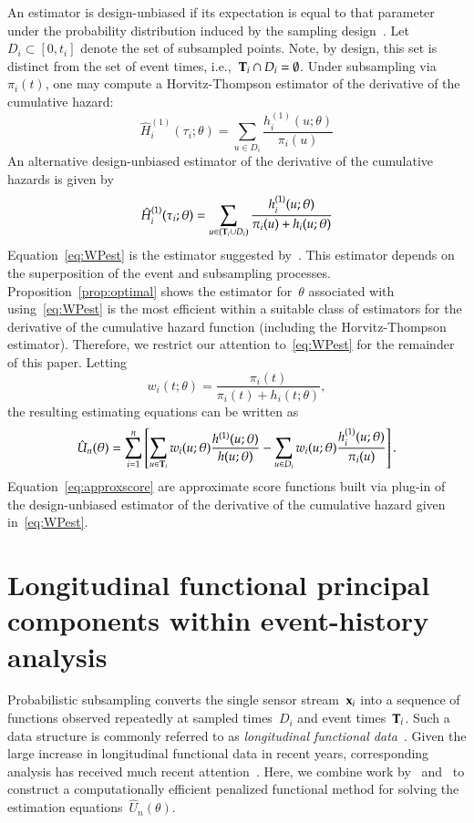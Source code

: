 \documentclass[12pt]{amsart}
\def\bfx{{\bf x}}
\def\bfT{{\bf T}}
\begin{document}
An estimator is design-unbiased if its expectation is equal to that
parameter under the probability distribution induced by the sampling
design~\citep{Cassel1977}. Let~$D_i \subset [0,t_i]$ denote the set of
subsampled points.  Note, by design, this set is distinct from the set
of event times, i.e.,~$\bfT_i \cap D_i = \emptyset$.  Under
subsampling via $\pi_i (t)$, one may compute a Horvitz-Thompson
estimator of the derivative of the cumulative hazard:
\[
\hat H_{i}^{(1)} (\tau_i; \theta) = \sum_{u \in D_i} \frac{
  h^{(1)}_i (u; \theta) }{ \pi_i (u) }
\]
An alternative design-unbiased estimator of the derivative of the
cumulative hazards is given by
\begin{equation}
\label{eq:WPest}
\hat H_{i}^{(1)} (\tau_i; \theta) = \sum_{u \in (\bfT_i \cup D_i)}
\frac{ h^{(1)}_i ( u; \theta ) }{ \pi_i (u) + h_i ( u ; \theta) }
\end{equation}
Equation~\eqref{eq:WPest} is the estimator suggested
by~\cite{Waagepetersen2008}.  This estimator depends on the
superposition of the event and subsampling processes.
Proposition~\ref{prop:optimal} shows the estimator for~$\theta$
associated with using~\eqref{eq:WPest} is the most efficient within a
suitable class of estimators for the derivative of the cumulative
hazard function (including the Horvitz-Thompson estimator).
Therefore, we restrict our attention to~\eqref{eq:WPest} for the
remainder of this paper. Letting
\begin{equation}
\label{eq:waage_weights}
w_i (t; \theta) = \frac{\pi_i (t)}{\pi_i (t) + h_i (t ; \theta)},
\end{equation}
the resulting estimating equations can be written as
\begin{equation}
\label{eq:approxscore}
\hat{U}_n (\theta) = \sum_{i=1}^n \left[ \sum_{u \in \bfT_i} w_i(u; \theta)
  \frac{h^{(1)} (u; \theta)}{ h ( u; \theta)}  - \sum_{u \in D_i} w_i(u;
  \theta) \frac{h_i^{(1)} (u; \theta)}{ \pi_i (u) } \right].
\end{equation}
Equation~\eqref{eq:approxscore} are approximate score functions built
via plug-in of the design-unbiased estimator of the derivative of the
cumulative hazard given in~\eqref{eq:WPest}.

\section{Longitudinal functional principal components within
  event-history analysis}

Probabilistic subsampling converts the single sensor stream~$\bfx_i$
into a sequence of functions observed repeatedly at sampled
times~$D_i$ and event times~$\bfT_i$. Such a data structure is
commonly referred to as \emph{longitudinal functional
  data}~\citep{Xiao2013, GoldSmith2015}.
Given the large increase in longitudinal functional data in recent
years, corresponding analysis has received much recent
attention~\citep{Morris2003, MorrisCarroll2006,
  Baladandayuthapani2008, Di2009, Greven2010, Staicu2010,
  ChenMuller2012, LiGuan2014}.
Here, we combine work by~\cite{Park2018} and~\cite{Goldsmith2011} to
construct a computationally efficient penalized functional method for
solving the estimation equations~$\hat U_n (\theta)$.
\end{document}
